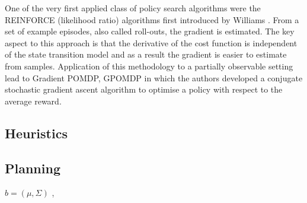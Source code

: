 

One of the very first applied class of policy search algorithms were the REINFORCE (likelihood ratio) algorithms
first introduced by Williams \cite{reinforce_1992}. From a set of example episodes, also called roll-outs, the gradient
is estimated. The key aspect to this approach is that the derivative of the cost function is independent of the state
transition model and as a result the gradient is easier to estimate from samples. Application of this methodology 
to a partially observable setting lead to Gradient POMDP, GPOMDP \cite{gpomdp_2000} in which the authors developed 
a conjugate stochastic gradient ascent algorithm to optimise a policy with respect to the average reward. 

\cite{sis_pomdp_2002}


\cite{PoWER_2009}
\cite{NAC_2008}

\cite{Pegasus_2000}
\cite{heli_2004}

\cite{RL_robots_surv_2013}
\cite{p_search_surv_2011}

\cite{dmp_seq_2012} %
\cite{dmp_iros_2011}


\cite{dense_entropy_icra_2014}
\cite{Uncer_reduction_heuristic_2015}
\cite{Sol_POMDP_Policy_space_1998}

\cite{sigma_hull_iros_2013}
\cite{int_motion_planning_2013}  %


\subsection{Heuristics}

\cite{next_best_touch}
\cite{CostalNavigation1999}

\subsection{Planning}
$b = (\mu,\Sigma)$
\cite{Quadrator_2008},
\cite{BelRoadMap_2009}

\cite{non_gauss_bel_plan_2012}	%
\cite{active_RSS_07} 	%
\cite{plan_cont_bel_space_2015}
\cite{rob_online_bs_icra_2014}
\cite{bel_roadmap_2009}


